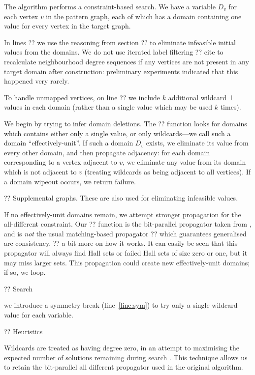 \documentclass[letterpaper]{article}
\newcommand{\citet}[1]{\citeauthor{#1} \shortcite{#1}}
\newcommand{\citep}[1]{\cite{#1}}
\theoremstyle{definition}
\begin{document}
The algorithm performs a constraint-based search. We have a variable $D_v$ for each vertex $v$ in
the pattern graph, each of which has a domain containing one value for every vertex in the target
graph.

In lines ?? we use the reasoning from section ?? to eliminate infeasible initial values from the
domains. We do not use iterated label filtering ?? cite to recalculate neighbourhood degree
sequences if any vertices are not present in any target domain after construction: preliminary
experiments indicated that this happened very rarely.

To handle unmapped vertices, on line ?? we include $k$ additional wildcard $\bot$ values in each
domain (rather than a single value which may be used $k$ times).

We begin by trying to infer domain deletions. The ?? function looks for domains which contains
either only a single value, or only wildcards---we call such a domain ``effectively-unit''. If such
a domain $D_v$ exists, we eliminate its value from every other domain, and then propagate adjacency:
for each domain corresponding to a vertex adjacent to $v$, we eliminate any value from its domain
which is not adjacent to $v$ (treating wildcards as being adjacent to all vertices). If a domain
wipeout occurs, we return failure.

?? Supplemental graphs. These are also used for eliminating infeasible values.

If no effectively-unit domains remain, we attempt stronger propagation for the all-different
constraint. Our ?? function is the bit-parallel propagator taken from
\citet{DBLP:conf/cp/McCreeshP15}, and is \emph{not} the usual matching-based propagator ?? which
guarantees generalised arc consistency. ?? a bit more on how it works. It can easily be seen that
this propagator will always find Hall sets or failed Hall sets of size zero or one, but it may miss
larger sets. This propagation could create new effectively-unit domains; if so, we loop.

?? Search

we introduce a symmetry
break (line~\ref{line:sym}) to try only a single wildcard value for each variable.

?? Heuristics

Wildcards are treated as having degree zero, in an attempt to maximising the expected number of
solutions remaining during search \citep{DBLP:conf/ijcai/McCreeshPT16}. This technique allows us to
retain the bit-parallel all different propagator used in the original algorithm.
\end{document}
